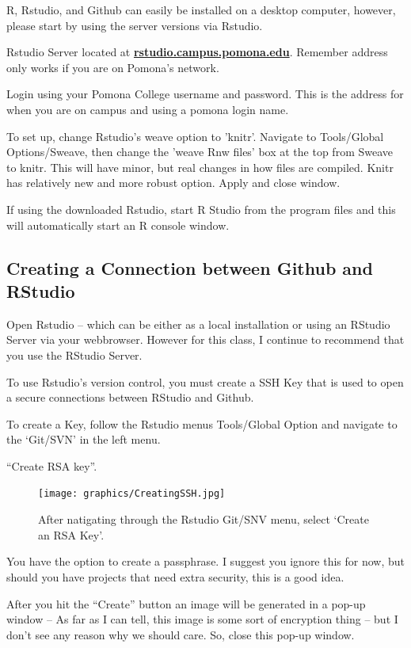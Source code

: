 \documentclass[12pt]{../SOP4_alpha}\usepackage[]{graphicx}\usepackage[]{color}
\begin{document}
\NP R, Rstudio, and Github can easily be installed on a desktop computer, however, please start by using the server versions via Rstudio. 

\NP Rstudio Server located at \href{http://rstudio.campus.pomona.edu}{\textbf{rstudio.campus.pomona.edu}}. Remember address only works if you are on Pomona's network. 

\NP Login using your Pomona College username and password. This is the address for when you are on campus and using a pomona login name. 

\NP To set up, change Rstudio's weave option to 'knitr'. Navigate to Tools/Global Options/Sweave, then change the 'weave Rnw files' box at the top from Sweave to knitr. This will have minor, but real changes in how files are compiled. Knitr has relatively new and more robust option. Apply and close window. 

\NP If using the downloaded Rstudio, start R Studio from the program files and this will automatically start an R console window.

\subsection{Creating a Connection between Github and RStudio}

\NP Open Rstudio -- which can be either as a local installation or using an RStudio Server via your webbrowser. However for this class, I continue to recommend that you use the RStudio Server.

\NP To use Rstudio's version control, you must create a SSH Key that is used to open a secure connections between RStudio and Github.

\NP To create a Key, follow the Rstudio menus Tools/Global Option and navigate to the `Git/SVN' in the left menu.

\NP ``Create RSA key''. 

\begin{figure}
\centering
\texttt{[image: graphics/CreatingSSH.jpg]}
\caption{After natigating through the Rstudio Git/SNV menu, select `Create an RSA Key'.}
\end{figure}

\NP You have the option to create a passphrase. I suggest you ignore this for now, but should you have projects that need extra security, this is a good idea.

\NP After you hit the ``Create'' button an image will be generated in a pop-up window -- As far as I can tell, this image is some sort of encryption thing -- but I don't see any reason why we should care. So, close this pop-up window. 
\end{document}
